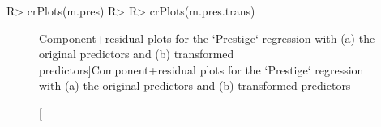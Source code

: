 \documentclass[
]{jss}
\begin{document}
\begin{CodeChunk}
\begin{CodeInput}
R> crPlots(m.pres)
R> 
R> crPlots(m.pres.trans)
\end{CodeInput}
\begin{figure}

{\centering {}\newline{}\newline

}

\caption[Component+residual plots for the `Prestige` regression with (a) the original predictors and (b) transformed predictors]{Component+residual plots for the `Prestige` regression with (a) the original predictors and (b) transformed predictors}\label{fig:CR-plots}
\end{figure}
\end{CodeChunk}
\end{document}
